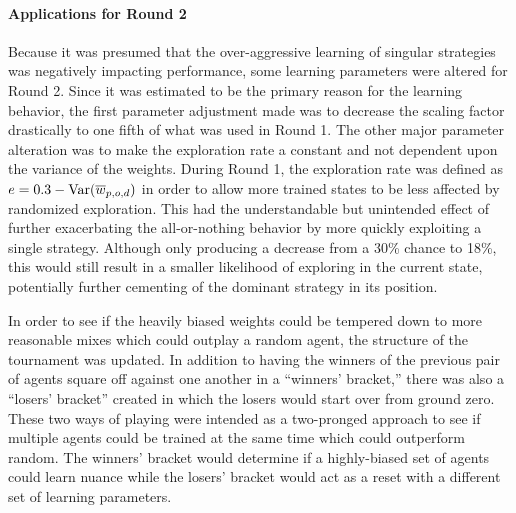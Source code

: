 




\paragraph*{Applications for Round 2}



Because it was presumed that the over-aggressive learning of singular strategies
was negatively impacting performance,
some learning parameters were altered for Round 2.
%
Since it was estimated to be the primary reason for the learning behavior,
the first parameter adjustment made was to decrease the scaling factor 
drastically to one fifth of what was used in Round 1.
%
The other major parameter alteration was to make the exploration rate a constant
and not dependent upon the variance of the weights.
%
During Round 1,
the exploration rate was defined as $e = 0.3 - \mathrm{Var}({\overline{w}_{p,o,d}})$
in order to allow more trained states to be less affected by randomized
exploration.
%
This had the understandable but unintended effect
of further exacerbating the all-or-nothing behavior
by more quickly exploiting a single strategy.
%
Although only producing a decrease from a 30\% chance to 18\%,
this would still result in a smaller likelihood of exploring in the current 
state,
potentially further cementing of the dominant strategy in its position.


In order to see if the heavily biased weights could be tempered down to more
reasonable mixes which could outplay a random agent,
the structure of the tournament was updated.
%
In addition to having the winners of the previous pair of agents square
off against one another in a ``winners' bracket,''
there was also a ``losers' bracket'' created
in which the losers would start over from ground zero.
%
These two ways of playing were intended as a two-pronged approach
to see if multiple agents could be trained at the same time
which could outperform random.
%
The winners' bracket would determine if a highly-biased set of agents could
learn nuance
while the losers' bracket would
act as a reset with a different set of learning parameters.

